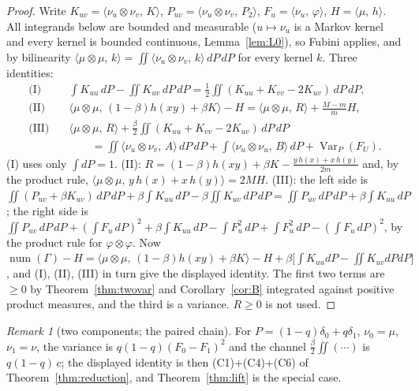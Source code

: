 \documentclass[11pt]{article}
\theoremstyle{plain}
\theoremstyle{definition}
\theoremstyle{remark}
\newtheorem{remark}[theorem]{Remark}
\newcommand{\pr}[2]{\langle #1,\,#2\rangle}
\newcommand{\num}{\operatorname{num}}
\newcommand{\Var}{\operatorname{Var}}
\begin{document}
\begin{proof}
Write $K_{uv}=\pr{\nu_u\otimes\nu_v}{K}$, $P_{uv}=\pr{\nu_u\otimes\nu_v}{P_2}$,
$F_u=\pr{\nu_u}{\varphi}$, $H=\pr{\mu}{h}$.  All integrands below are bounded
and measurable ($u\mapsto\nu_u$ is a Markov kernel and every kernel is
bounded continuous, Lemma~\ref{lem:L0}), so Fubini applies, and by
bilinearity $\pr{\mu\otimes\mu}{k}=\iint\pr{\nu_u\otimes\nu_v}{k}\,dP\,dP$ for
every kernel $k$.  Three identities:
\begin{align*}
\text{(I)}\quad&\int K_{uu}\,dP-\iint K_{uv}\,dP\,dP=\tfrac12\iint(K_{uu}+K_{vv}-2K_{uv})\,dP\,dP,\\
\text{(II)}\quad&\pr{\mu\otimes\mu}{(1-\beta)h(xy)+\beta K}-H=\pr{\mu\otimes\mu}{R}+\tfrac{M-m}{m}H,\\
\text{(III)}\quad&\pr{\mu\otimes\mu}{R}+\tfrac\beta2\iint(K_{uu}+K_{vv}-2K_{uv})\,dP\,dP\\
&\qquad=\iint\pr{\nu_u\otimes\nu_v}{A}\,dP\,dP+\int\pr{\nu_u\otimes\nu_u}{B}\,dP+\Var_P(F_U).
\end{align*}
(I) uses only $\int dP=1$.  (II): $R=(1-\beta)h(xy)+\beta K-\frac{y\,h(x)+x\,h(y)}{2m}$
and, by the product rule, $\pr{\mu\otimes\mu}{y\,h(x)+x\,h(y)}=2MH$.
(III): the left side is $\iint(P_{uv}+\beta K_{uv})\,dP\,dP+\beta\int K_{uu}\,dP
-\beta\iint K_{uv}\,dP\,dP=\iint P_{uv}\,dP\,dP+\beta\int K_{uu}\,dP$; the right
side is $\iint P_{uv}\,dP\,dP+(\int F_u\,dP)^2+\beta\int K_{uu}\,dP-\int F_u^2\,dP
+\int F_u^2\,dP-(\int F_u\,dP)^2$, by the product rule for
$\varphi\otimes\varphi$.  Now
$\num(\Gamma)-H=\pr{\mu\otimes\mu}{(1-\beta)h(xy)+\beta K}-H+\beta\bigl[\int K_{uu}dP-\iint K_{uv}dPdP\bigr]$,
and (I), (II), (III) in turn give the displayed identity.  The first two
terms are $\ge0$ by Theorem~\ref{thm:twovar} and Corollary~\ref{cor:B}
integrated against positive product measures, and the third is a variance.
$R\ge0$ is not used.
\end{proof}

\begin{remark}[two components; the paired chain]
For $P=(1-q)\delta_0+q\delta_1$, $\nu_0=\mu$, $\nu_1=\nu$, the variance is
$q(1-q)(F_0-F_1)^2$ and the channel $\frac\beta2\iint(\cdots)$ is
$q(1-q)\,c$; the displayed identity is then (C1)+(C4)+(C6) of
Theorem~\ref{thm:reduction}, and Theorem~\ref{thm:lift} is the special case.
\end{remark}
\end{document}
